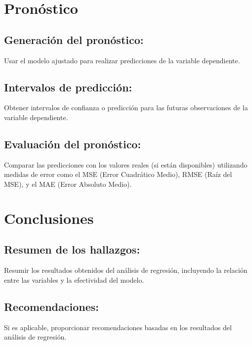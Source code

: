 \documentclass[10pt]{article}
\begin{document}






\section{Pronóstico}
\subsection{Generación del pronóstico:}
Usar el modelo ajustado para realizar predicciones de la variable dependiente.

\subsection{Intervalos de predicción:}
Obtener intervalos de confianza o predicción para las futuras observaciones de la variable dependiente.

\subsection{Evaluación del pronóstico:}
Comparar las predicciones con los valores reales (si están disponibles) utilizando medidas de error como el MSE (Error Cuadrático Medio), RMSE (Raíz del MSE), y el MAE (Error Absoluto Medio).
\section{Conclusiones}
\subsection{Resumen de los hallazgos:}
Resumir los resultados obtenidos del análisis de regresión, incluyendo la relación entre las variables y la efectividad del modelo.

\subsection{Recomendaciones:}
Si es aplicable, proporcionar recomendaciones basadas en los resultados del análisis de regresión.
\end{document}
